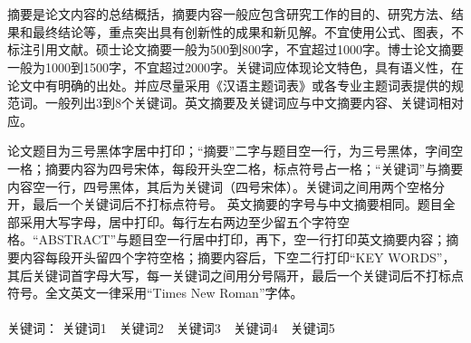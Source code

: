 \section*{\ArticleTitle}
\begin{cnabstract}
\fontsize{14pt}{17.5pt}\selectfont %
\par
摘要是论文内容的总结概括，摘要内容一般应包含研究工作的目的、研究方法、结果和最终结论等，重点突出具有创新性的成果和新见解。不宜使用公式、图表，不标注引用文献。硕士论文摘要一般为500到800字，不宜超过1000字。博士论文摘要一般为1000到1500字，不宜超过2000字。关键词应体现论文特色，具有语义性，在论文中有明确的出处。并应尽量采用《汉语主题词表》或各专业主题词表提供的规范词。一般列出3到8个关键词。英文摘要及关键词应与中文摘要内容、关键词相对应。
\par
论文题目为三号黑体字居中打印；“摘要”二字与题目空一行，为三号黑体，字间空一格；摘要内容为四号宋体，每段开头空二格，标点符号占一格；“关键词”与摘要内容空一行，四号黑体，其后为关键词（四号宋体）。关键词之间用两个空格分开，最后一个关键词后不打标点符号。
英文摘要的字号与中文摘要相同。题目全部采用大写字母，居中打印。每行左右两边至少留五个字符空格。“ABSTRACT”与题目空一行居中打印，再下，空一行打印英文摘要内容；摘要内容每段开头留四个字符空格；摘要内容后，下空二行打印“KEY WORDS”，其后关键词首字母大写，每一关键词之间用分号隔开，最后一个关键词后不打标点符号。全文英文一律采用“Times New Roman”字体。
\\
\\
\heiti 关键词：
\songti 关键词1\ \ 关键词2\ \ 关键词3\ \ 关键词4\ \ 关键词5

\end{cnabstract}
\pagebreak


